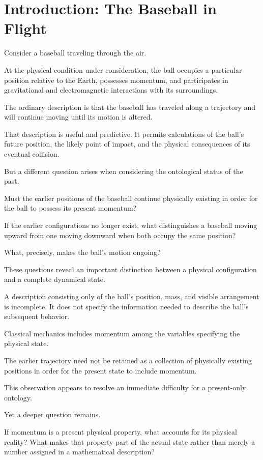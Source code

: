 \documentclass[12pt,onecolumn]{article}
\begin{document}
\section{Introduction: The Baseball in Flight}

Consider a baseball traveling through the air.

At the physical condition under consideration, the ball occupies a particular position relative to the Earth, possesses momentum, and participates in gravitational and electromagnetic interactions with its surroundings.

The ordinary description is that the baseball has traveled along a trajectory and will continue moving until its motion is altered.

That description is useful and predictive. It permits calculations of the ball's future position, the likely point of impact, and the physical consequences of its eventual collision.

But a different question arises when considering the ontological status of the past.

Must the earlier positions of the baseball continue physically existing in order for the ball to possess its present momentum?

If the earlier configurations no longer exist, what distinguishes a baseball moving upward from one moving downward when both occupy the same position?

What, precisely, makes the ball's motion ongoing?

These questions reveal an important distinction between a physical configuration and a complete dynamical state.

A description consisting only of the ball's position, mass, and visible arrangement is incomplete. It does not specify the information needed to describe the ball's subsequent behavior.

Classical mechanics includes momentum among the variables specifying the physical state.

The earlier trajectory need not be retained as a collection of physically existing positions in order for the present state to include momentum.

This observation appears to resolve an immediate difficulty for a present-only ontology.

Yet a deeper question remains.

If momentum is a present physical property, what accounts for its physical reality? What makes that property part of the actual state rather than merely a number assigned in a mathematical description?
\end{document}
